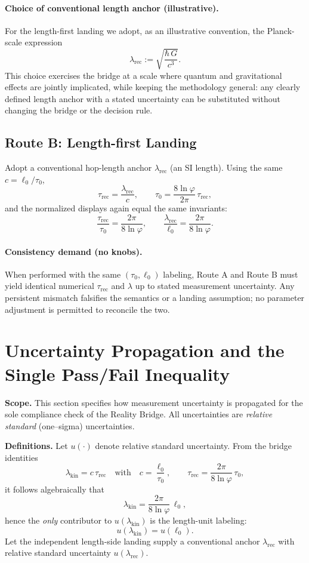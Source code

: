 \documentclass[11pt]{article}
\begin{document}
\paragraph{Choice of conventional length anchor (illustrative).}
For the length-first landing we adopt, as an illustrative convention, the Planck-scale expression
\[
\lambda_{\mathrm{rec}}:=\sqrt{\frac{\hbar\,G}{c^{3}}}.
\]
This choice exercises the bridge at a scale where quantum and gravitational effects are jointly implicated, while keeping the methodology general: any clearly defined length anchor with a stated uncertainty can be substituted without changing the bridge or the decision rule.

\subsection*{Route B: Length-first Landing}
Adopt a conventional hop-length anchor \(\lambda_{\mathrm{rec}}\) (an SI length). Using the same \(c=\ell_{0}/\tau_{0}\),
\[
\tau_{\mathrm{rec}}=\frac{\lambda_{\mathrm{rec}}}{c},
\qquad
\tau_{0}=\frac{8\ln\varphi}{2\pi}\,\tau_{\mathrm{rec}},
\]
and the normalized displays again equal the same invariants:
\[
\frac{\tau_{\mathrm{rec}}}{\tau_{0}}=\frac{2\pi}{8\ln\varphi},
\qquad
\frac{\lambda_{\mathrm{rec}}}{\ell_{0}}=\frac{2\pi}{8\ln\varphi}.
\]

\paragraph{Consistency demand (no knobs).}
When performed with the same \((\tau_{0},\ell_{0})\) labeling, Route A and Route B must yield identical numerical \(\tau_{\mathrm{rec}}\) and \(\lambda\) up to stated measurement uncertainty. Any persistent mismatch falsifies the semantics or a landing assumption; no parameter adjustment is permitted to reconcile the two.

\section{Uncertainty Propagation and the Single Pass/Fail Inequality}

\noindent\textbf{Scope.} This section specifies how measurement uncertainty is propagated for the sole compliance check of the Reality Bridge. All uncertainties are \emph{relative standard} (one–sigma) uncertainties.

\medskip
\noindent\textbf{Definitions.} Let \(u(\cdot)\) denote relative standard uncertainty. From the bridge identities
\[
\lambda_{\mathrm{kin}}=c\,\tau_{\mathrm{rec}}
\quad\text{with}\quad
c=\frac{\ell_{0}}{\tau_{0}},
\qquad
\tau_{\mathrm{rec}}=\frac{2\pi}{8\ln\varphi}\,\tau_{0},
\]
it follows algebraically that
\[
\lambda_{\mathrm{kin}}
=\frac{2\pi}{8\ln\varphi}\,\ell_{0},
\]
hence the \emph{only} contributor to \(u(\lambda_{\mathrm{kin}})\) is the length-unit labeling:
\[
u(\lambda_{\mathrm{kin}})=u(\ell_{0}).
\]
Let the independent length-side landing supply a conventional anchor \(\lambda_{\mathrm{rec}}\) with relative standard uncertainty \(u(\lambda_{\mathrm{rec}})\).
\end{document}
